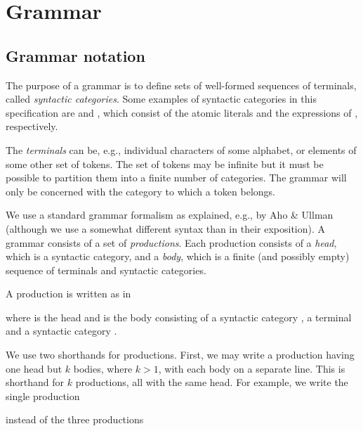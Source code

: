 \section{Grammar}

\subsection{Grammar notation}


The purpose of a grammar is to define sets of well-formed sequences of
terminals, called \emph{syntactic categories}.  Some examples of syntactic categories in this
specification are  and , which consist of
the atomic literals and the expressions of \Erlang, respectively.

The \emph{terminals} can be, e.g., individual
characters of some alphabet, or elements of some other set of tokens.
The set of tokens may be infinite but it must be possible
to partition them into a finite number of categories.  The grammar
will only be concerned with the category to which a token belongs.

We use a standard grammar
formalism as explained, e.g., by Aho
\& Ullman \cite{aho+ullman:foundations}
(although we use a somewhat different syntax than in their
exposition).  A grammar consists of a set of
\emph{productions}.  Each production consists of
a \emph{head}, which is a syntactic category, and a
\emph{body}, which is a finite (and possibly
empty) sequence of terminals and syntactic categories.

A production is written as in
\begin{rules}
       { \TXT{=} }
\end{rules}
where  is the head and  \TXT{=}
 is the body consisting of a syntactic category
, a terminal \TXT{=} and a syntactic category
.

We use two shorthands for productions.  First, we may write a production
having one head but $k$ bodies, where $k>1$, with each body on a separate line.
This is shorthand for $k$ productions, all with the same head.  For example,
we write the single production
\begin{rules}
       {   \OR
           \OR
        }
\end{rules}
instead of the three productions
\begin{rules}
       {  }

       {  }

       {}
\end{rules}

